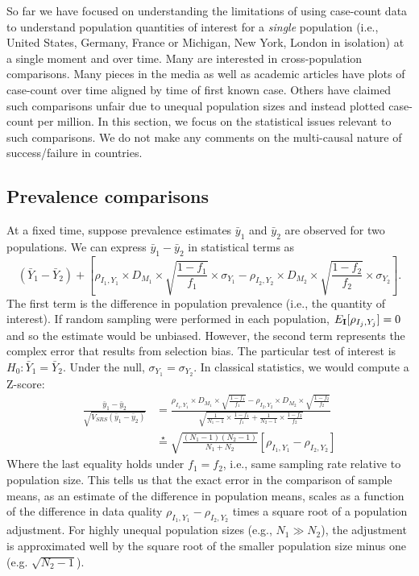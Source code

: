 \documentclass[aoas]{amsart}
\def\I{\bf I}
\begin{document}
So far we have focused on understanding the limitations of using case-count data to understand population quantities of interest for a \emph{single} population (i.e., United States, Germany, France or Michigan, New York, London in isolation) at a single moment and over time.  Many are interested in cross-population comparisons.  Many pieces in the media as well as academic articles have plots of case-count over time aligned by time of first known case.  Others have claimed such comparisons unfair due to unequal population sizes and instead plotted case-count per million.  In this section, we focus on the statistical issues relevant to such comparisons. We do not make any comments on the multi-causal nature of success/failure in countries.

\subsection{Prevalence comparisons}

At a fixed time, suppose prevalence estimates $\bar y_1$ and $\bar y_2$ are observed for two populations. We can express $\bar y_1 - \bar y_2$ in statistical terms as
$$
(\bar Y_1 - \bar Y_2) + \left[ \rho_{I_1, Y_1} \times D_{M_1} \times \sqrt{\frac{1-f_1}{f_1}} \times \sigma_{Y_1}  - \rho_{I_2, Y_2} \times D_{M_2} \times \sqrt{\frac{1-f_2}{f_2}} \times \sigma_{Y_2} \right].
$$
The first term is the difference in population prevalence (i.e., the quantity of interest).  If random sampling were performed in each population, $E_{\I} [ \rho_{I_j, Y_j}] = 0$ and so the estimate would be unbiased.  However, the second term represents the complex error that results from selection bias.
The particular test of interest is $H_0: \bar Y_1 = \bar Y_2$.  Under the null, $\sigma_{Y_1} = \sigma_{Y_2}$.  In classical statistics, we would compute a Z-score:
$$
\begin{aligned}
\frac{\bar y_1 - \bar y_2}{ \sqrt{V_{SRS} (\bar y_1 - \bar y_2)} } &=
\frac{\rho_{I_1, Y_1} \times D_{M_1} \times \sqrt{\frac{1-f_1}{f_1}}  - \rho_{I_2, Y_2} \times D_{M_2} \times \sqrt{\frac{1-f_2}{f_2}} }{ \sqrt{\frac{1}{N_1 -1} \times \frac{1-f_1}{f_1} + \frac{1}{N_2 - 1} \times \frac{1-f_2}{f_2}} }  \\
&\overset{\star}{=}
\sqrt{\frac{(N_1-1)(N_2 -1)}{N_1 + N_2}} \left[ \rho_{I_1, Y_1} - \rho_{I_2, Y_2} \right]
\end{aligned}
$$
Where the last equality holds under $f_1 = f_2$, i.e., same sampling rate relative to population size. This tells us that the exact error in the comparison of sample means, as an estimate of the difference in population means, scales as a function of the difference in data quality $\rho_{I_1, Y_1} - \rho_{I_2, Y_2}$ times a square root of a population adjustment.  For highly unequal population sizes (e.g., $N_1 \gg N_2$), the adjustment is approximated well by the square root of the smaller population size minus one (e.g. $\sqrt{N_2 -1}$).
\end{document}
